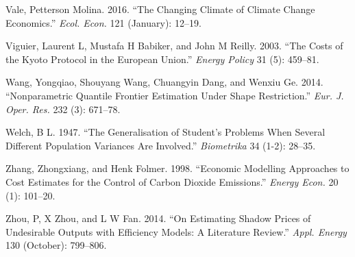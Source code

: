 \documentclass[
  10pt,
]{article}
\begin{document}
\leavevmode\hypertarget{ref-Vale2016}{}%
Vale, Petterson Molina. 2016. ``The Changing Climate of Climate Change
Economics.'' \emph{Ecol. Econ.} 121 (January): 12--19.

\leavevmode\hypertarget{ref-Viguier2003}{}%
Viguier, Laurent L, Mustafa H Babiker, and John M Reilly. 2003. ``The
Costs of the Kyoto Protocol in the European Union.'' \emph{Energy
Policy} 31 (5): 459--81.

\leavevmode\hypertarget{ref-Wang2014}{}%
Wang, Yongqiao, Shouyang Wang, Chuangyin Dang, and Wenxiu Ge. 2014.
``Nonparametric Quantile Frontier Estimation Under Shape Restriction.''
\emph{Eur. J. Oper. Res.} 232 (3): 671--78.

\leavevmode\hypertarget{ref-Welch1947}{}%
Welch, B L. 1947. ``The Generalisation of Student's Problems When
Several Different Population Variances Are Involved.'' \emph{Biometrika}
34 (1-2): 28--35.

\leavevmode\hypertarget{ref-Zhang1998}{}%
Zhang, Zhongxiang, and Henk Folmer. 1998. ``Economic Modelling
Approaches to Cost Estimates for the Control of Carbon Dioxide
Emissions.'' \emph{Energy Econ.} 20 (1): 101--20.

\leavevmode\hypertarget{ref-Zhou2014}{}%
Zhou, P, X Zhou, and L W Fan. 2014. ``On Estimating Shadow Prices of
Undesirable Outputs with Efficiency Models: A Literature Review.''
\emph{Appl. Energy} 130 (October): 799--806.
\end{document}
